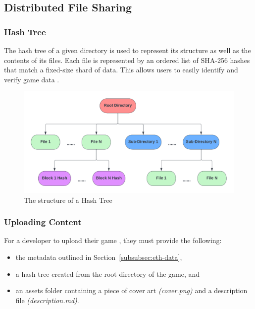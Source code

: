 \subsection{Distributed File Sharing}
\label{subsec:design-p2p}

\subsubsection*{Hash Tree}
\label{subsubsec:hash-tree}

The hash tree of a given directory is used to represent its structure as well as the contents of its files. Each file is represented by an ordered list of SHA-256 hashes that match a fixed-size shard of data. This allows users to easily identify and verify game data .

\begin{figure}[ht]
  \centering
  \includegraphics[width=.85\textwidth]{assets/images/diagrams/block-body.png}
  \caption{The structure of a Hash Tree}
  \label{fig:hash-storage}
\end{figure}

\subsubsection*{Uploading Content}
\label{subsubsec:upload-content}

For a developer to upload their game , they must provide the following:

\begin{itemize}
  \item the metadata outlined in Section~\ref{subsubsec:eth-data},
  \item a hash tree created from the root directory of the game, and
  \item an assets folder containing a piece of cover art \textit{(cover.png)} and a description file \textit{(description.md)}.
\end{itemize}

